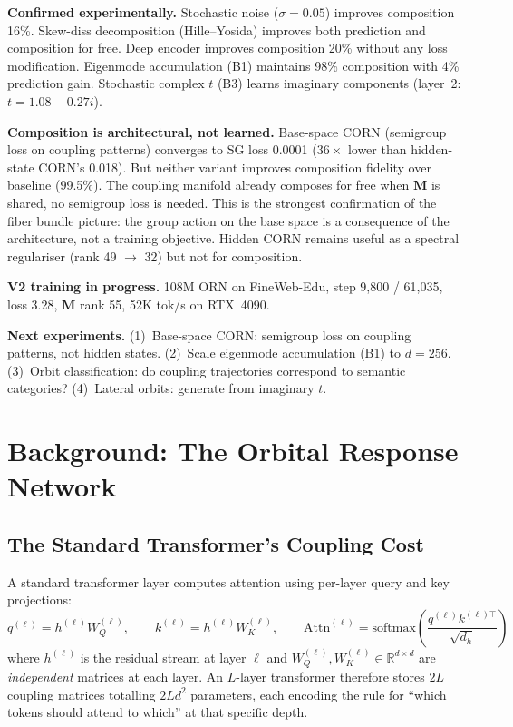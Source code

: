 \documentclass[11pt, a4paper]{article}
\newcommand{\M}{\mathbf{M}}
\newcommand{\R}{\mathbb{R}}
\theoremstyle{plain}
\theoremstyle{remark}
\begin{document}
{{\medskip
\textbf{Confirmed experimentally.}
Stochastic noise ($\sigma{=}0.05$) improves composition 16\%.
Skew-diss decomposition (Hille--Yosida) improves both prediction and composition for free.
Deep encoder improves composition 20\% without any loss modification.
Eigenmode accumulation (B1) maintains 98\% composition with 4\% prediction gain.
Stochastic complex $t$ (B3) learns imaginary components (layer~2: $t{=}1.08{-}0.27i$).

\medskip
\textbf{Composition is architectural, not learned.}
Base-space CORN (semigroup loss on coupling patterns) converges to SG loss 0.0001 ($36\times$ lower than hidden-state CORN's 0.018).
But neither variant improves composition fidelity over baseline (99.5\%).
The coupling manifold already composes for free when $\M$ is shared, no semigroup loss is needed.
This is the strongest confirmation of the fiber bundle picture: the group action on the base space is a consequence of the architecture, not a training objective.
Hidden CORN remains useful as a spectral regulariser (rank 49 $\to$ 32) but not for composition.

\medskip
\textbf{V2 training in progress.}
108M ORN on FineWeb-Edu, step 9,800 / 61,035, loss 3.28, $\M$ rank 55, 52K tok/s on RTX~4090.

\medskip
\textbf{Next experiments.}
(1)~Base-space CORN: semigroup loss on coupling patterns, not hidden states.
(2)~Scale eigenmode accumulation (B1) to $d{=}256$.
(3)~Orbit classification: do coupling trajectories correspond to semantic categories?
(4)~Lateral orbits: generate from imaginary $t$.
}}

\section{Background: The Orbital Response Network}

\subsection{The Standard Transformer's Coupling Cost}

A standard transformer layer computes attention using per-layer query and key projections:
\begin{equation}
    q^{(\ell)} = h^{(\ell)} W_Q^{(\ell)}, \qquad k^{(\ell)} = h^{(\ell)} W_K^{(\ell)}, \qquad \text{Attn}^{(\ell)} = \text{softmax}\!\left(\frac{q^{(\ell)} k^{(\ell)\top}}{\sqrt{d_h}}\right)
\end{equation}
where $h^{(\ell)}$ is the residual stream at layer $\ell$ and $W_Q^{(\ell)}, W_K^{(\ell)} \in \R^{d \times d}$ are \emph{independent} matrices at each layer.
An $L$-layer transformer therefore stores $2L$ coupling matrices totalling $2Ld^2$ parameters, each encoding the rule for ``which tokens should attend to which'' at that specific depth.
\end{document}
